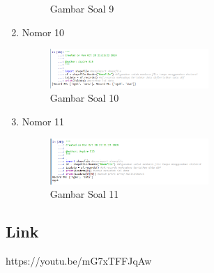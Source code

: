\begin{enumerate}
\begin{figure}[H]
		\centering
		\caption{Gambar Soal 9}
	\end{figure}
	\item Nomor 10
	
	\begin{figure}[H]
		\includegraphics[width=6cm]{figures/Tugas3/1174074/soal10.png}
		\centering
		\caption{Gambar Soal 10 }
	\end{figure}
	\item Nomor 11
	
	\begin{figure}[H]
		\includegraphics[width=6cm]{figures/Tugas3/1174074/soal11.png}
		\centering
		\caption{Gambar Soal 11 }
	\end{figure}
\end{enumerate}
\subsection{Link}
https://youtu.be/mG7xTFFJqAw
